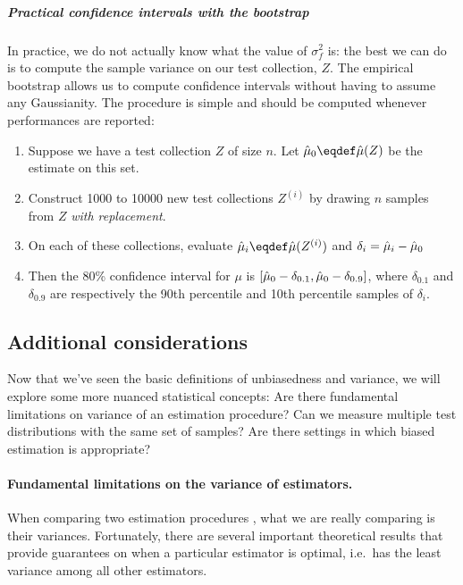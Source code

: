 \subparagraph{Practical confidence intervals with the bootstrap}
In practice, we do not actually know what the value of $\sigma^2_f$ is: the best we can do is to compute the sample variance on our test collection, $Z$.
The empirical bootstrap allows us to compute confidence intervals without having to assume any Gaussianity.
The procedure is simple and should be computed whenever performances are reported:
\begin{enumerate}
  \item Suppose we have a test collection $Z$ of size $n$. Let $\muh_0 \eqdef \muh(Z)$ be the estimate on this set.
  \item Construct 1000 to 10000 new test collections $Z^{(i)}$ by drawing $n$ samples from $Z$ \textit{with replacement}.
  \item On each of these collections, evaluate $\muh_{i} \eqdef \muh(Z^{(i)})$ and $\delta_i = \hat{\mu}_i - \hat{\mu}_0$
  \item Then the 80\% confidence interval for $\mu$ is $[\hat{\mu}_0 - \delta_{0.1}, \hat{\mu}_0 - \delta_{0.9}]$, where $\delta_{0.1}$ and $\delta_{0.9}$ are respectively the 90th percentile and 10th percentile samples of $\delta_i$. 
\end{enumerate}

\subsection{Additional considerations}
Now that we've seen the basic definitions of unbiasedness and variance, we will explore some more nuanced statistical concepts:
  Are there fundamental limitations on variance of an estimation procedure?
  Can we measure multiple test distributions with the same set of samples?
  Are there settings in which biased estimation is appropriate? 

\paragraph{Fundamental limitations on the variance of estimators.}
When comparing two estimation procedures , what we are really comparing is their variances.
Fortunately, there are several important theoretical results that provide guarantees on when a particular estimator is optimal, i.e.\ has the least variance among all other estimators.

